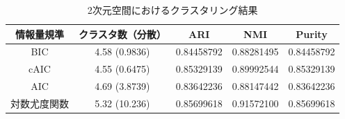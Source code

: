 \begin{table}[htb]
  \centering
  \caption{2次元空間におけるクラスタリング結果}
  \label{table:2dim}
  \begin{tabular}{|c|c|c|c|c|} \hline
    情報量規準 & クラスタ数（分散） & ARI & NMI & Purity \\\hline
    BIC & 4.58 (0.9836) & 0.84458792 & 0.88281495 & 0.84458792\\
    cAIC & 4.55 (0.6475) & 0.85329139 & 0.89992544 & 0.85329139\\
    AIC & 4.69 (3.8739) & 0.83642236 & 0.88147442 & 0.83642236\\
    対数尤度関数 & 5.32 (10.236) & 0.85699618 & 0.91572100 & 0.85699618\\\hline 
  \end{tabular}
\end{table}

